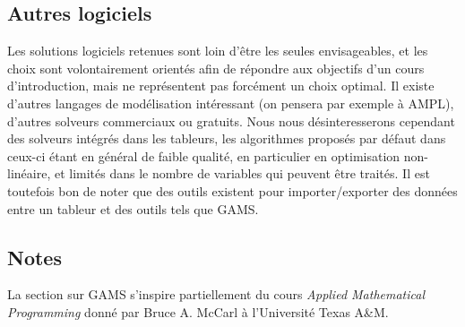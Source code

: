 
\subsection{Autres logiciels}

Les solutions logiciels retenues sont loin d'être les seules envisageables, et les choix sont volontairement orientés afin de répondre aux objectifs d'un cours d'introduction, mais ne représentent pas forcément un choix optimal.
Il existe d'autres langages de modélisation intéressant (on pensera par exemple à AMPL), d'autres solveurs commerciaux ou gratuits.
Nous nous désinteresserons cependant des solveurs intégrés dans les tableurs, les algorithmes proposés par défaut dans ceux-ci étant en général de faible qualité, en particulier en optimisation non-linéaire, et limités dans le nombre de variables qui peuvent être traités.
Il est toutefois bon de noter que des outils existent pour importer/exporter des données entre un tableur et des outils tels que GAMS.

\begin{small}
\section{Notes}

La section sur GAMS s'inspire partiellement du cours {\sl Applied Mathematical Programming} donné par Bruce A. McCarl à l'Université Texas A\&M.

\end{small}